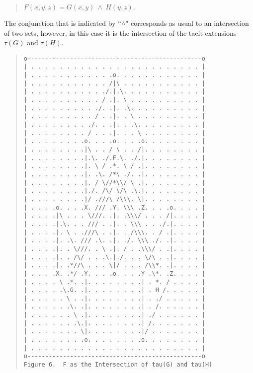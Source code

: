 \documentclass[12pt]{article}
\begin{document}
\begin{quote}
$F(x, y, z) = G(x, y)\ \land\ H(y, z).$
\end{quote}

The conjunction that is indicated by ``$\land$" corresponds as usual to an intersection of two sets, however, in this case it is the intersection of the tacit extensions $\tau(G)$ and $\tau(H)$.

\begin{quote}\begin{verbatim}
o-------------------------------------------------o
| . . . . . . . . . . . . . . . . . . . . . . . . |
| . . . . . . . . . . . .o. . . . . . . . . . . . |
| . . . . . . . . . . . /|\ . . . . . . . . . . . |
| . . . . . . . . . . ./.|.\. . . . . . . . . . . |
| . . . . . . . . . . / .|. \ . . . . . . . . . . |
| . . . . . . . . . ./. .|. .\. . . . . . . . . . |
| . . . . . . . . . / . .|. . \ . . . . . . . . . |
| . . . . . . . . ./. . .|. . .\. . . . . . . . . |
| . . . . . . . . / . . .|. . . \ . . . . . . . . |
| . . . . . . . .o. . . .o. . . .o. . . . . . . . |
| . . . . . . . .|\ . . / \ . . /|. . . . . . . . |
| . . . . . . . .|.\. ./.F.\. ./.|. . . . . . . . |
| . . . . . . . .|. \ / .*. \ / .|. . . . . . . . |
| . . . . . . . .|. .\. /*\ ./. .|. . . . . . . . |
| . . . . . . . .|. / \//*\\/ \ .|. . . . . . . . |
| . . . . . . . .|./. /\/ \/\ .\.|. . . . . . . . |
| . . . . . . . .|/ .///\ /\\\. \|. . . . . . . . |
| . . . .o. . . .X. /// .Y. \\\ .Z. . . .o. . . . |
| . . . .|\ . . . \///. .|. .\\\/ . . . /|. . . . |
| . . . .|.\. . . /// . .|. . \\\ . . ./.|. . . . |
| . . . .|. \ . .///\ . .|. . /\\\. . / .|. . . . |
| . . . .|. .\. /// .\. .|. ./. \\\ ./. .|. . . . |
| . . . .|. . \///. . \ .|. / . .\\\/ . .|. . . . |
| . . . .|. . /\/ . . .\.|./. . . \/\ . .|. . . . |
| . . . .|. .*//\ . . . \|/ . . . /\\*. .|. . . . |
| . . . .X. .*/ .Y. . . .o. . . .Y .\*. .Z. . . . |
| . . . . \ .*. .|. . . . . . . .| . *. / . . . . |
| . . . . .\.G. .|. . . . . . . .| . H /. . . . . |
| . . . . . \ . .|. . . . . . . .| . ./ . . . . . |
| . . . . . .\. .|. . . . . . . .| . /. . . . . . |
| . . . . . . \ .|. . . . . . . .| ./ . . . . . . |
| . . . . . . .\.|. . . . . . . .| /. . . . . . . |
| . . . . . . . \|. . . . . . . .|/ . . . . . . . |
| . . . . . . . .o. . . . . . . .o. . . . . . . . |
| . . . . . . . . . . . . . . . . . . . . . . . . |
o-------------------------------------------------o
Figure 6.  F as the Intersection of tau(G) and tau(H)
\end{verbatim}\end{quote}
\end{document}
